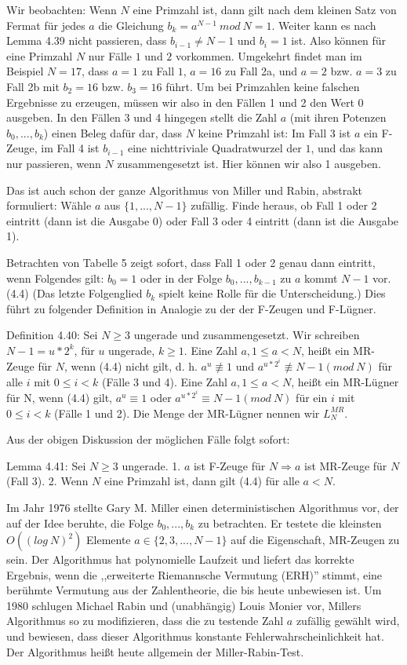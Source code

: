 \documentclass[a4paper]{article}
\begin{document}
\begin{multicols}{3}
        Wir beobachten: Wenn $N$ eine Primzahl ist, dann gilt nach dem kleinen Satz von Fermat für jedes $a$ die Gleichung $b_k=a^{N-1}\ mod\ N=1$. Weiter kann es nach Lemma 4.39 nicht passieren, dass $b_{i-1}\not=N-1$ und $b_i=1$ ist. Also können für eine Primzahl $N$ nur Fälle $1$ und $2$ vorkommen. Umgekehrt findet man im Beispiel $N=17$, dass $a=1$ zu Fall $1$, $a=16$ zu Fall 2a, und $a=2$ bzw. $a=3$ zu Fall 2b mit $b_2=16$ bzw. $b_3=16$ führt. Um bei Primzahlen keine falschen Ergebnisse zu erzeugen, müssen wir also in den Fällen 1 und 2 den Wert 0 ausgeben. In den Fällen 3 und 4 hingegen stellt die Zahl $a$ (mit ihren Potenzen $b_0,...,b_k$) einen Beleg dafür dar, dass $N$ keine Primzahl ist: Im Fall 3 ist $a$ ein F-Zeuge, im Fall 4 ist $b_{i-1}$ eine nichttriviale Quadratwurzel der $1$, und das kann nur passieren, wenn $N$ zusammengesetzt ist. Hier können wir also 1 ausgeben.

        Das ist auch schon der ganze Algorithmus von Miller und Rabin, abstrakt formuliert: Wähle $a$ aus $\{1,...,N-1\}$ zufällig. Finde heraus, ob Fall 1 oder 2 eintritt (dann ist die Ausgabe 0) oder Fall 3 oder 4 eintritt (dann ist die Ausgabe 1).

        Betrachten von Tabelle 5 zeigt sofort, dass Fall 1 oder 2 genau dann eintritt, wenn Folgendes gilt: $b_0=1$ oder in der Folge $b_0,...,b_{k-1}$ zu $a$ kommt $N-1$ vor. (4.4) (Das letzte Folgenglied $b_k$ spielt keine Rolle für die Unterscheidung.) Dies führt zu folgender Definition in Analogie zu der der F-Zeugen und F-Lügner.

        Definition 4.40: Sei $N\geq 3$ ungerade und zusammengesetzt. Wir schreiben $N-1=u*2^k$, für $u$ ungerade, $k\geq 1$. Eine Zahl $a, 1\leq a < N$, heißt ein MR-Zeuge für $N$, wenn (4.4) nicht gilt, d. h. $a^u\not\equiv 1$ und $a^{u*2^i}\not\equiv N-1 (mod\ N)$ für alle $i$ mit $0\leq i < k$ (Fälle 3 und 4). Eine Zahl $a, 1\leq a < N$, heißt ein MR-Lügner für N, wenn (4.4) gilt, $a^u\equiv 1$ oder $a^{u*2^i}\equiv N-1 (mod\ N)$ für ein $i$ mit $0\leq i < k$ (Fälle 1 und 2). Die Menge der MR-Lügner nennen wir $L^{MR}_N$.

        Aus der obigen Diskussion der möglichen Fälle folgt sofort:

        Lemma 4.41: Sei $N\geq 3$ ungerade.
        1. $a$ ist F-Zeuge für $N \Rightarrow a$ ist MR-Zeuge für $N$ (Fall 3).
        2. Wenn $N$ eine Primzahl ist, dann gilt (4.4) für alle $a<N$.

        Im Jahr 1976 stellte Gary M. Miller einen deterministischen Algorithmus vor, der auf der Idee beruhte, die Folge $b_0,...,b_k$ zu betrachten. Er testete die kleinsten $O((log\ N)^2)$ Elemente $a\in\{2,3,...,N-1\}$ auf die Eigenschaft, MR-Zeugen zu sein. Der Algorithmus hat polynomielle Laufzeit und liefert das korrekte Ergebnis, wenn die ,,erweiterte Riemannsche Vermutung (ERH)'' stimmt, eine berühmte Vermutung aus der Zahlentheorie, die bis heute unbewiesen ist. Um 1980 schlugen Michael Rabin und (unabhängig) Louis Monier vor, Millers Algorithmus so zu modifizieren, dass die zu testende Zahl $a$ zufällig gewählt wird, und bewiesen, dass dieser Algorithmus konstante Fehlerwahrscheinlichkeit hat. Der Algorithmus heißt heute allgemein der Miller-Rabin-Test.


\end{multicols}
\end{document}
